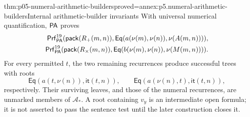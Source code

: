 \begin{hbtheorem}{thm:p05-numeral-arithmetic-builders}{proved=annex:p5.numeral-arithmetic-builders}{Internal arithmetic-builder invariants}
With universal numerical quantification, \(\mathsf{PA}\) proves
\[
\begin{aligned}
 \mathsf{Prf}^{19}_{\mathsf{PA}}
  (\mathsf{pack}(R_+(m,n)),\mathsf{Eq}(a(\nu(m),\nu(n)),\nu(A(m,n)))),\\
 \mathsf{Prf}^{19}_{\mathsf{PA}}
  (\mathsf{pack}(R_\times(m,n)),\mathsf{Eq}(b(\nu(m),\nu(n)),\nu(M(m,n)))).
\end{aligned}
\]
For every permitted \(t\), the two remaining recurrences produce successful
trees with roots
\[
 \mathsf{Eq}(a(t,\nu(n)),\mathsf{it}(t,n)),\qquad
 \mathsf{Eq}(a(\nu(n),t),\mathsf{it}(t,n)),
\]
respectively. Their surviving leaves, and those of the numeral recurrences,
are unmarked members of \(\mathcal A_*\). A root containing \(v_y\)
is an intermediate open formula; it is not asserted to pass the sentence
test until the later construction closes it.
\end{hbtheorem}

